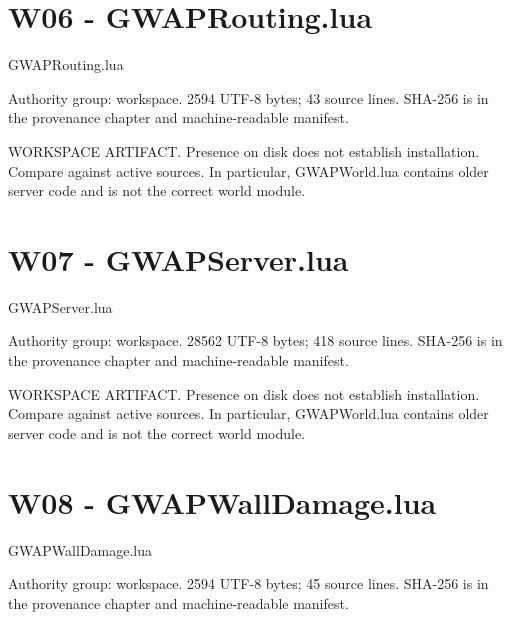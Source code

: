 \chapter{W06 - GWAPRouting.\allowbreak{}lua}
\label{src:W06}
GWAPRouting.\allowbreak{}lua

Authority group: workspace.\allowbreak{} 2594 UTF-8 bytes; 43 source lines.\allowbreak{} SHA-256 is in the provenance chapter and machine-readable manifest.\allowbreak{}

WORKSPACE ARTIFACT.\allowbreak{} Presence on disk does not establish installation.\allowbreak{} Compare against active sources.\allowbreak{} In particular, GWAPWorld.\allowbreak{}lua contains older server code and is not the correct world module.\allowbreak{}

\begingroup{}
\endgroup
\chapter{W07 - GWAPServer.\allowbreak{}lua}
\label{src:W07}
GWAPServer.\allowbreak{}lua

Authority group: workspace.\allowbreak{} 28562 UTF-8 bytes; 418 source lines.\allowbreak{} SHA-256 is in the provenance chapter and machine-readable manifest.\allowbreak{}

WORKSPACE ARTIFACT.\allowbreak{} Presence on disk does not establish installation.\allowbreak{} Compare against active sources.\allowbreak{} In particular, GWAPWorld.\allowbreak{}lua contains older server code and is not the correct world module.\allowbreak{}

\begingroup{}
\endgroup
\chapter{W08 - GWAPWallDamage.\allowbreak{}lua}
\label{src:W08}
GWAPWallDamage.\allowbreak{}lua

Authority group: workspace.\allowbreak{} 2594 UTF-8 bytes; 45 source lines.\allowbreak{} SHA-256 is in the provenance chapter and machine-readable manifest.\allowbreak{}

